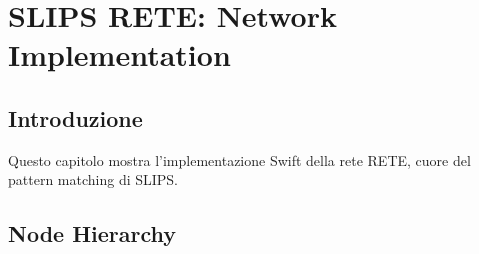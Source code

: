 
\chapter{SLIPS RETE: Network Implementation}
\label{cap:slips_rete}

\section{Introduzione}

Questo capitolo mostra l'implementazione Swift della rete RETE, cuore del pattern matching di SLIPS.

\section{Node Hierarchy}

